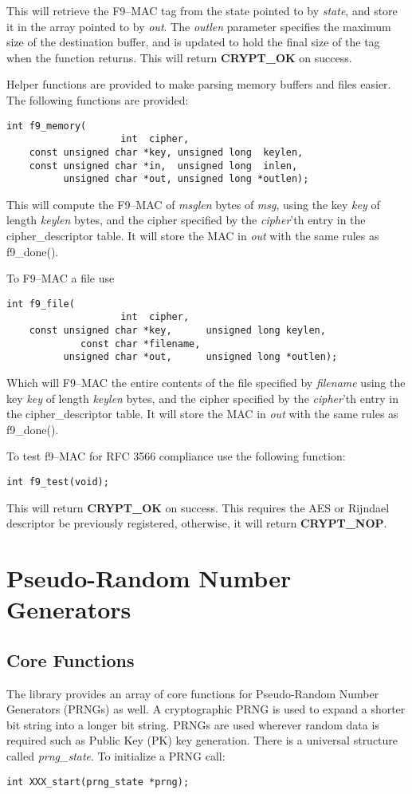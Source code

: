 \documentclass[synpaper]{book}
\newcommand{\mysection}[1]    %
	{                   %
	\section{#1}
   \markboth{\textsf{www.libtom.org}}{\thesection ~ {#1}}
	}
\begin{document}
This will retrieve the F9--MAC tag from the state pointed to by \textit{state}, and store it in the array pointed to by \textit{out}.  The \textit{outlen} parameter
specifies the maximum size of the destination buffer, and is updated to hold the final size of the tag when the function returns.  This will return 
\textbf{CRYPT\_OK} on success.

Helper functions are provided to make parsing memory buffers and files easier.  The following functions are provided:

\begin{verbatim}
int f9_memory(
                    int  cipher, 
    const unsigned char *key, unsigned long  keylen,
    const unsigned char *in,  unsigned long  inlen,
          unsigned char *out, unsigned long *outlen);
\end{verbatim}
This will compute the F9--MAC of \textit{msglen} bytes of \textit{msg}, using the key \textit{key} of length \textit{keylen} bytes, and the cipher
specified by the \textit{cipher}'th entry in the cipher\_descriptor table.  It will store the MAC in \textit{out} with the same rules as f9\_done().

To F9--MAC a file use
\begin{verbatim}
int f9_file(
                    int  cipher, 
    const unsigned char *key,      unsigned long keylen,
             const char *filename, 
          unsigned char *out,      unsigned long *outlen);
\end{verbatim}

Which will F9--MAC the entire contents of the file specified by \textit{filename} using the key \textit{key} of length \textit{keylen} bytes, and the cipher 
specified by the \textit{cipher}'th entry in the cipher\_descriptor table.  It will store the MAC in \textit{out} with the same rules as f9\_done().


To test f9--MAC for RFC 3566 compliance use the following function:

\begin{verbatim}
int f9_test(void);
\end{verbatim}

This will return \textbf{CRYPT\_OK} on success.  This requires the AES or Rijndael descriptor be previously registered, otherwise, it will return 
\textbf{CRYPT\_NOP}. 

\chapter{Pseudo-Random Number Generators}
\mysection{Core Functions}
The library provides an array of core functions for Pseudo-Random Number Generators (PRNGs) as well.  A cryptographic PRNG is
used to expand a shorter bit string into a longer bit string.  PRNGs are used wherever random data is required such as Public Key (PK)
key generation.  There is a universal structure called \textit{prng\_state}.  To initialize a PRNG call:
\begin{verbatim}
int XXX_start(prng_state *prng);
\end{verbatim}
\end{document}

